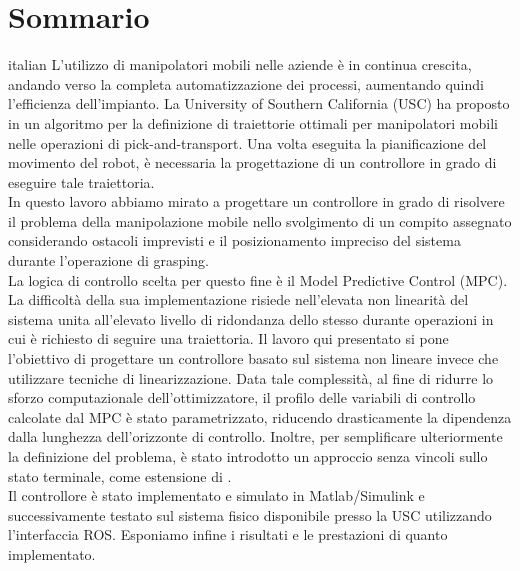 	\newpage
\chapter*{Sommario}

\begin{otherlanguage*}{italian}
	L'utilizzo di manipolatori mobili nelle aziende è in continua crescita, andando verso la completa automatizzazione dei processi, aumentando quindi l'efficienza dell'impianto. La University of Southern California (USC) ha proposto in \cite{shantanuthakar} un algoritmo per la definizione di traiettorie ottimali per manipolatori mobili nelle operazioni di pick-and-transport. Una volta eseguita la pianificazione del movimento del robot, è necessaria la progettazione di un controllore in grado di eseguire tale traiettoria. \\
	In questo lavoro abbiamo mirato a progettare un controllore in grado di risolvere il problema della manipolazione mobile nello svolgimento di un compito assegnato considerando ostacoli imprevisti e il posizionamento impreciso del sistema durante l'operazione di grasping. \\
	La logica di controllo scelta per questo fine è il Model Predictive Control (MPC). La difficoltà della sua implementazione risiede nell'elevata non linearità del sistema unita all'elevato livello di ridondanza dello stesso durante operazioni in cui è richiesto di seguire una traiettoria. Il lavoro qui presentato si pone l'obiettivo di progettare un controllore basato sul sistema non lineare invece che utilizzare tecniche di linearizzazione. Data tale complessità, al fine di ridurre lo sforzo computazionale dell'ottimizzatore, il profilo delle variabili di controllo calcolate dal MPC è stato parametrizzato, riducendo drasticamente la dipendenza dalla lunghezza dell'orizzonte di controllo. Inoltre, per semplificare ulteriormente la definizione del problema, è stato introdotto un approccio senza vincoli sullo stato terminale, come estensione di \cite{alamir2018stability}. \\
	Il controllore è stato implementato e simulato in Matlab/Simulink e successivamente testato sul sistema fisico disponibile presso la USC utilizzando l'interfaccia ROS. Esponiamo infine i risultati e le prestazioni di quanto implementato.
\end{otherlanguage*}


\vspace{0.5cm}
\noindent 
